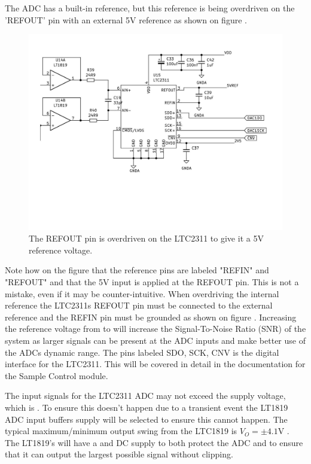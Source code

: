 The ADC has a built-in  reference, but this reference is being overdriven on the 'REFOUT' pin with an external 5V reference as shown on figure .

\begin{figure}[H]
    \centering
    \includegraphics[clip, trim=0 150 0 0, width=1\textwidth]{Sections/7_SystemDesign/Figures/7_1_2_ADC5V.pdf}
    \caption{The REFOUT pin is overdriven on the LTC2311 to give it a 5V reference voltage.}
    \label{fig_7_1_2_ADC5VREF}
\end{figure}

Note how on the figure that the reference pins are labeled "REFIN" and "REFOUT" and that the 5V input is applied at the REFOUT pin. This is not a mistake, even if it may be counter-intuitive. When overdriving the internal reference the LTC2311s REFOUT pin must be connected to the external reference and the REFIN pin must be grounded as shown on figure . Increasing the reference voltage from  to  will increase the Signal-To-Noise Ratio (SNR) of the system as larger signals can be present at the ADC inputs and make better use of the ADCs dynamic range. The pins labeled SDO, SCK, CNV is the digital interface for the LTC2311. This will be covered in detail in the documentation for the Sample Control module.

The input signals for the LTC2311 ADC may not exceed the supply voltage, which is . To ensure this doesn't happen due to a transient event the LT1819 ADC input buffers supply will be selected to ensure this cannot happen. The typical maximum/minimum output swing from the LTC1819 is $V_{O} = \pm 4.1$V \cite{OPAMP_LT1819}. The LT1819's will have a  and  DC supply to both protect the ADC and to ensure that it can output the largest possible signal without clipping.  


